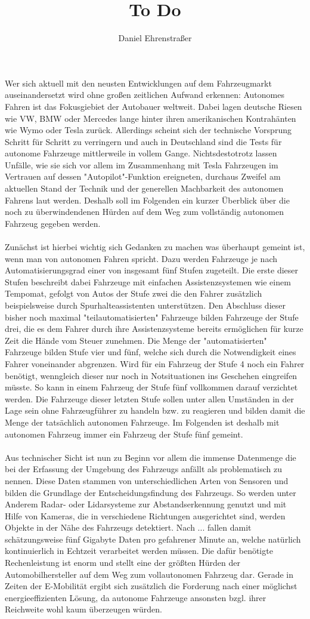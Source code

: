 \documentclass[10pt,a4paper]{article}
\author{Daniel Ehrenstraßer}
\title{To Do}
\begin{document}
\noindent
Wer sich aktuell mit den neusten Entwicklungen auf dem Fahrzeugmarkt auseinandersetzt wird ohne großen zeitlichen Aufwand erkennen: Autonomes Fahren ist das Fokusgiebiet der Autobauer weltweit. Dabei lagen deutsche Riesen wie VW, BMW oder Mercedes lange hinter ihren amerikanischen Kontrahänten wie Wymo oder Tesla zurück. Allerdings scheint sich der technische Vorsprung Schritt für Schritt zu verringern und auch in Deutschland sind die Tests für autonome Fahrzeuge mittlerweile in vollem Gange. Nichtsdestotrotz lassen Unfälle, wie sie sich vor allem im Zusammenhang mit Tesla Fahrzeugen im Vertrauen auf dessen "Autopilot"-Funktion ereigneten, durchaus Zweifel am aktuellen Stand der Technik und der generellen Machbarkeit des autonomen Fahrens laut werden. Deshalb soll im Folgenden ein kurzer Überblick über die noch zu überwindendenen Hürden auf dem Weg zum vollständig autonomen Fahrzeug gegeben werden.
\\
\\
Zunächst ist hierbei wichtig sich Gedanken zu machen was überhaupt gemeint ist, wenn man von autonomen Fahren spricht. Dazu werden Fahrzeuge je nach Automatisierungsgrad einer von insgesamt fünf Stufen zugeteilt. Die erste dieser Stufen beschreibt dabei Fahrzeuge mit einfachen Assistenzsystemen wie einem Tempomat, gefolgt von Autos der Stufe zwei die den Fahrer zusätzlich beispielsweise durch Spurhalteassistenten unterstützen. Den Abschluss dieser bisher noch maximal "teilautomatisierten" Fahrzeuge bilden Fahrzeuge der Stufe drei, die es dem Fahrer durch ihre Assistenzsysteme bereits ermöglichen für kurze Zeit die Hände vom Steuer zunehmen. Die Menge der "automatisierten" Fahrzeuge bilden Stufe vier und fünf, welche sich durch die Notwendigkeit eines Fahrer voneinander abgrenzen. Wird für ein Fahrzeug der Stufe 4 noch ein Fahrer benötigt, wenngleich dieser nur noch in Notsituationen ins Geschehen eingreifen müsste. So kann in einem Fahrzeug der Stufe fünf vollkommen darauf verzichtet werden. Die Fahrzeuge dieser letzten Stufe sollen unter allen Umständen in der Lage sein ohne Fahrzeugführer zu handeln bzw. zu reagieren und bilden damit die Menge der tatsächlich autonomen Fahrzeuge. Im Folgenden ist deshalb mit autonomen Fahrzeug immer ein Fahrzeug der Stufe fünf gemeint.
\\
\\
Aus technischer Sicht ist nun zu Beginn vor allem die immense Datenmenge die bei der Erfassung der Umgebung des Fahrzeugs anfällt als problematisch zu nennen. Diese Daten stammen von unterschiedlichen Arten von Sensoren und bilden die Grundlage der Entscheidungsfindung des Fahrzeugs. So werden unter Anderem Radar- oder Lidarsysteme zur Abstandserkennung genutzt und mit Hilfe von Kameras, die in verschiedene Richtungen ausgerichtet sind, werden Objekte in der Nähe des Fahrzeugs detektiert. Nach ... fallen damit schätzungsweise fünf Gigabyte Daten pro gefahrener Minute an, welche natürlich kontinuierlich in Echtzeit verarbeitet werden müssen. Die dafür benötigte Rechenleistung ist enorm und stellt eine der größten Hürden der Automobilhersteller auf dem Weg zum vollautonomen Fahrzeug dar. Gerade in Zeiten der E-Mobilität ergibt sich zusätzlich die Forderung nach einer möglichst energieeffizienten Lösung, da autonome Fahrzeuge ansonsten bzgl. ihrer Reichweite wohl kaum überzeugen würden. 
\end{document}

